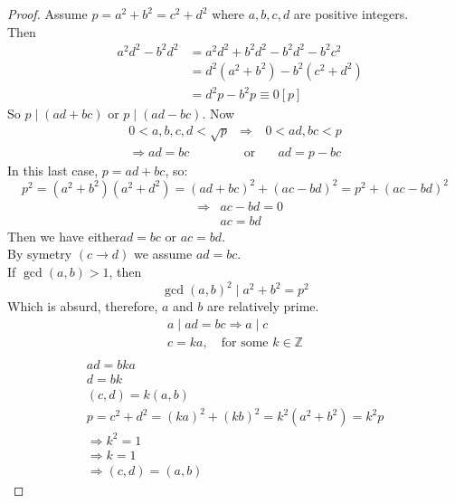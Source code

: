 \documentclass{report}
\begin{document}
\begin{proof} Assume $p= a^2+b^2=c^2+d^2$ where $a,b,c,d$ are positive integers.\\
Then \[ \begin{array}{lcl}
				&a^2d^2-b^2d^2&=a^2d^2+b^2d^2-b^2d^2-b^2c^2\\
				&&=d^2(a^2+b^2)-b^2(c^2+d^2)\\
				&&=d^2p-b^2p\equiv 0[p]
				\end{array}\]
				So $p\mid(ad+bc)$ or $p \mid (ad-bc)$.
				Now \[\begin{array}{lcl}
							0<a,b,c,d<\sqrt{p} &\Rightarrow& 0<ad,bc<p\\
							\Rightarrow ad=bc \quad &\text{ or}& \quad ad=p-bc
							\end{array}\]
\newpage
				In this last case, $p=ad+bc$, so:\[p^2=(a^2+b^2)(a^2+d^2)=(ad+bc)^2+(ac-bd)^2=p^2+(ac-bd)^2\]
																					\[\begin{array}{lcl}
																						&\Rightarrow& ac-bd=0\\
																						&&ac=bd
																						\end{array}\]
				Then we have either$ ad=bc$ or $ac=bd$.\\
				By symetry $(c\rightarrow d)$ we assume $ad=bc$.\\
				If $\gcd(a,b)>1$, then \[\gcd(a,b)^2\mid  a^2+b^2=p^2\] Which is absurd, therefore, $a$ and $b$ are relatively prime.
															\[\begin{array}{lcl}
															a\mid ad=bc \Rightarrow a\mid c\\
															c=ka,\quad \text{for some }k \in \mathbb{Z}\\
															\end{array}\]
				\[\begin{array}{lcr}
				ad=bka\\
				d=bk\\
				(c,d)=k(a,b)\\
				p=c^2+d^2=(ka)^2+(kb)^2=k^2(a^2+b^2)=k^2p\\
				\Rightarrow k^2=1\\
				\Rightarrow k=1\\
				\Rightarrow (c,d)=(a,b)
				\end{array}\]
				
\end{proof}
\end{document}
